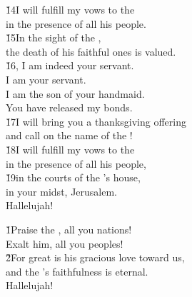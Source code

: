 \begin{poetry}
\poeml \v{14}I will fulfill my vows to the  \\
\poemll    in the presence of all his people. \\
\poeml \v{15}In the sight of the , \\
\poemll    the death of his faithful ones is valued. \\
\poeml \v{16}, I am indeed your servant. \\
\poemll    I am your servant. \\
\poeml I am the son of your handmaid. \\
\poemll    You have released my bonds. \\
\poeml \v{17}I will bring you a thanksgiving offering \\
\poemll    and call on the name of the ! \\
\poeml \v{18}I will fulfill my vows to the  \\
\poemll    in the presence of all his people, \\
\poeml \v{19}in the courts of the 's house, \\
\poemll    in your midst, Jerusalem. \\
\poeml Hallelujah!
\end{poetry}

\begin{poetry}
\poeml \v{1}Praise the , all you nations! \\
\poemll    Exalt him, all you peoples! \\
\poeml \v{2}For great is his gracious love toward us, \\
\poemll    and the 's faithfulness is eternal. \\
\poeml Hallelujah!
\end{poetry}

